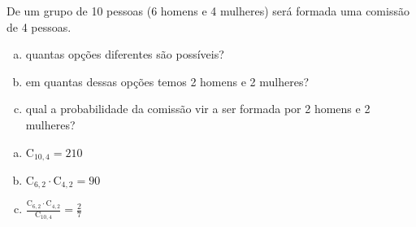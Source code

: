 \begin{ex}
 De um grupo de 10 pessoas (6 homens e 4 mulheres) será formada uma comissão de 4 pessoas.
    \begin{enumerate}[(a)]
    \item quantas opções diferentes são possíveis?
    \item em quantas dessas opções temos 2 homens e 2 mulheres?
    \item qual a probabilidade da comissão vir a ser formada por 2 homens e 2 mulheres?
    \end{enumerate}
      \begin{sol}
          \phantom{A}  
        \begin{enumerate} [(a)] 
            \item  $\mathrm{C}_{{10},4}=210$
            \item $\mathrm{C}_{6,2}\cdot\mathrm{C}_{4,2}=90$
            \item $\frac{\mathrm{C}_{6,2}\cdot\mathrm{C}_{4,2}}{\mathrm{C}_{{10},4}}=\frac{2}{7}$
        \end{enumerate}
      
      \end{sol}
\end{ex}